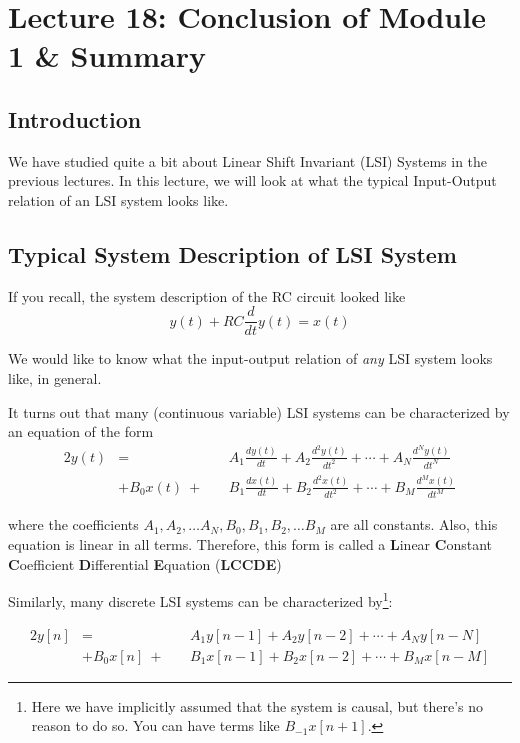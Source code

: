 \section{Lecture 18: Conclusion of Module 1 \& Summary}


\subsection{Introduction}
We have studied quite a bit about Linear Shift Invariant (LSI) Systems in the previous lectures. In this lecture, we will look at what the typical Input-Output relation of an LSI system looks like.

\subsection{Typical System Description of LSI System}

If you recall, the system description of the RC circuit looked like \[ y(t) + RC\frac{d}{dt}y(t) = x(t)\]

We would like to know what the input-output relation of \emph{any} LSI system looks like, in general.

It turns out that many (continuous variable) LSI systems can be characterized by an equation of the form
\begin{alignat}{2}
y(t)& = && A_1\frac{dy(t)}{dt} + A_2\frac{d^2y(t)}{dt^2}+ \cdots + A_N\frac{d^Ny(t)}{dt^N} \nonumber \\
&+ B_0x(t)\ +\ && B_1\frac{dx(t)}{dt} + B_2\frac{d^2x(t)}{dt^2}+ \cdots + B_M\frac{d^Mx(t)}{dt^M}
\end{alignat}

where  the coefficients $A_1, A_2, \ldots A_N, B_0, B_1, B_2, \ldots B_M$ are all constants. Also, this equation is linear in all terms. Therefore, this form is called a \textbf{L}inear \textbf{C}onstant \textbf{C}oefficient \textbf{D}ifferential \textbf{E}quation (\textbf{LCCDE})

Similarly, many discrete LSI systems can be characterized by\footnote{Here we have implicitly assumed that the system is causal, but there's no reason to do so. You can have terms like $B_{-1}x[n+1]$.}:

\begin{alignat}{2}
y[n]& = && A_1y[n-1] + A_2y[n-2] + \cdots + A_Ny[n-N] \nonumber \\
&+ B_0x[n]\ +\ && B_1x[n-1] + B_2x[n-2] + \cdots + B_Mx[n-M]
\end{alignat}

